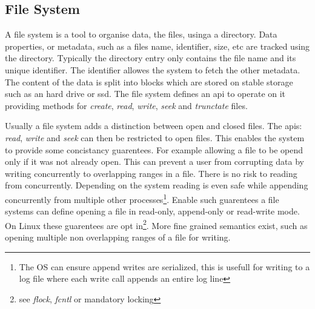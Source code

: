 \subsection{File System}
A file system is a tool to organise data, the files, usinga a directory. Data properties, or metadata, such as a files name, identifier, size, etc are tracked using the directory. Typically the directory entry only contains the file name and its unique identifier. The identifier allowes the system to fetch the other metadata. The content of the data is split into blocks which are stored on stable storage such as an hard drive or ssd. The file system defines an \ac{api} to operate on it providing methods for \textit{create}, \textit{read}, \textit{write}, \textit{seek} and \textit{trunctate} files. 

Usually a file system adds a distinction between open and closed files. The \acp{api}: \textit{read}, \textit{write} and \textit{seek} can then be restricted to open files. This enables the system to provide some concistancy guarentees. For example allowing a file to be opend only if it was not already open. This can prevent a user from corrupting data by writing concurrently to overlapping ranges in a file. There is no risk to reading from concurrently. Depending on the system reading is even safe while appending concurrently from multiple other processes\footnote{The OS can ensure append writes are serialized, this is usefull for writing to a log file where each write call appends an entire log line}. Enable such guarentees a file systems can define opening a file in read-only, append-only or read-write mode. On Linux these guarentees are opt in\footnote{see \textsl{flock}, \textsl{fcntl} or mandatory locking}. More fine grained semantics exist, such as opening multiple non overlapping ranges of a file for writing. 

